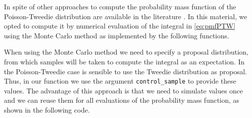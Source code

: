 \documentclass[9pt,a5paper,]{book}
\newenvironment{Shaded}{}{}
\newcommand{\KeywordTok}[1]{\textbf{{#1}}}
\newcommand{\DataTypeTok}[1]{\underline{{#1}}}
\newcommand{\StringTok}[1]{{#1}}
\newcommand{\CommentTok}[1]{\textit{{#1}}}
\newcommand{\NormalTok}[1]{{#1}}
\renewenvironment{Shaded}{\color{inputcolor}}{}
\renewcommand{\DataTypeTok}[1]{{#1}}
\theoremstyle{definition}
\theoremstyle{definition}
\theoremstyle{remark}
\begin{document}
In spite of other approaches to compute the probability mass function of
the Poisson-Tweedie distribution are available in the literature
\citetext{\citealp[ ]{Esnaola2013}; \citealp{Barabesi2016}}. In this
material, we opted to compute it by numerical evaluation of the integral
in \eqref{eq:pmfPTW} using the Monte Carlo method as implemented by the
following functions.

\begin{Shaded}
\end{Shaded}

When using the Monte Carlo method we need to specify a proposal
distribution, from which samples will be taken to compute the integral
as an expectation. In the Poisson-Tweedie case is sensible to use the
Tweedie distribution as proposal. Thus, in our function we use the
argument \texttt{control\_sample} to provide these values. The advantage
of this approach is that we need to simulate values once and we can
reuse them for all evaluations of the probability mass function, as
shown in the following code.
\end{document}
